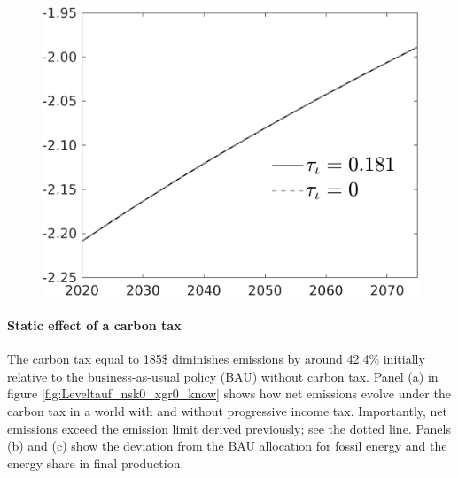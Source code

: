 \begin{figure}[h!!]
\begin{minipage}[]{0.32\textwidth}
\end{minipage}
\begin{minipage}[]{0.32\textwidth}
\includegraphics[width=1\textwidth]{../../codding_model/own_basedOnFried/optimalPol_010922_revision/figures/all_13Sept22/PerdifNoTauf_regime0_CompTaul_EY_spillover0_nsk0_xgr0_knspil0_sep0_LFlimit0_emsbase0_countec0_GovRev0_etaa0.79_lgd1.png}
\end{minipage}

\end{figure} 

\paragraph{Static effect of a carbon tax}
 The carbon tax equal to 185\$ diminishes emissions by around 42.4\% initially relative to the business-as-usual policy (BAU) without carbon tax.
 Panel (a) in figure \ref{fig:Leveltauf_nsk0_xgr0_know} shows how net emissions evolve under the carbon tax in a world with and without progressive income tax. Importantly, net emissions exceed the emission limit  derived previously; see the dotted line. Panels (b) and (c) show the deviation from the BAU allocation for fossil energy and the energy share in final production.
 
